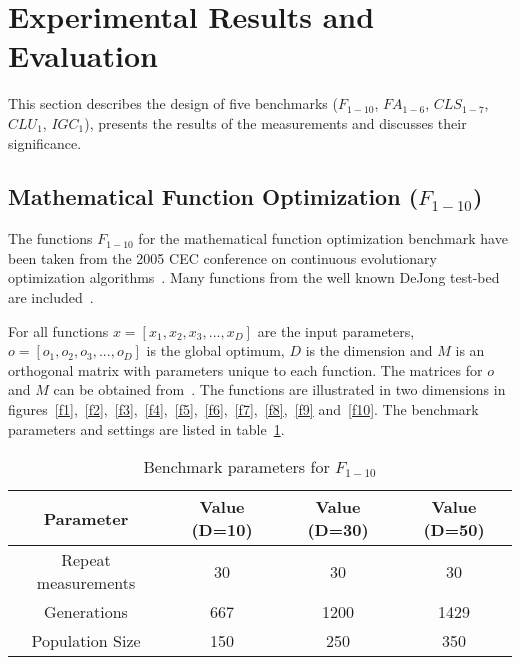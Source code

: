 \section{Experimental Results and Evaluation} \label{section:benchmark}

This section describes the design of five benchmarks ($F_{1-10}$, $FA_{1-6}$, $CLS_{1-7}$, $CLU_{1}$, $IGC_{1}$), presents the results of the measurements and discusses their significance.



\subsection{Mathematical Function Optimization ($F_{1-10}$)}

The functions $F_{1-10}$ for the mathematical function optimization benchmark have been taken from the 2005 CEC conference on continuous evolutionary optimization algorithms~\cite{suganthan2005problem}. Many functions from the well known DeJong test-bed are included~\cite{Whitley1996245}.

For all functions $x=[x_1,x_2,x_3,...,x_D]$ are the input parameters, $o=[o_1,o_2,o_3,...,o_D]$ is the global optimum, $D$ is the dimension and $M$ is an orthogonal matrix with parameters unique to each function. The matrices for $o$ and $M$ can be obtained from~\cite{suganthan2005problem}.
The functions are illustrated in two dimensions in figures~\ref{f1},~\ref{f2},~\ref{f3},~\ref{f4},~\ref{f5},~\ref{f6},~\ref{f7},~\ref{f8},~\ref{f9} and~\ref{f10}. The benchmark parameters and settings are listed in table~\ref{table:f1-10_params}.

\begin{table}[H]
  \centering
  \begin{center}
    \footnotesize
    \begin{tabular}{ | c | c | c | c | }
      \hline
      Parameter & Value (D=10) & Value (D=30) & Value (D=50) \\ \hline
      Repeat measurements & 30 & 30 & 30 \\ \hline
      Generations & 667 & 1200 & 1429 \\ \hline
      Population Size & 150 & 250 & 350 \\ \hline
    \end{tabular}
  \end{center}
  \caption{Benchmark parameters for $F_{1-10}$}
  \label{table:f1-10_params}
\end{table}

